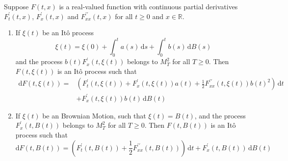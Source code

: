 \begin{theorem}[It\^o Formula]
	Suppose $F\left(t,x\right)$ is a real-valued function with continuous partial derivatives $F_{t}^{\prime}\left(t,x\right)$, $F_{x}^{\prime}\left(t,x\right)$ and $F_{xx}^{\prime\prime}\left(t,x\right)$ for all $t\geq 0$ and $x\in\mathbb{R}$.
	\begin{enumerate}
		\item If $\xi(t)$ be an It\^o process
		      \begin{equation*}
			      \xi(t)=\xi(0)+\int_{0}^{t}a(s)\,\mathrm{d}s+\int_{0}^{t}b(s)\,\mathrm{d}B(s)
		      \end{equation*}
		      and the process $b(t)F_{x}^{\prime}(t,\xi(t))$ belongs to $M_{T}^{2}$ for all $T\geq 0$. Then $F(t,\xi(t))$ is an It\^o process such that
		      \begin{equation}
			      \begin{aligned}
				      \mathrm{d}F(t,\xi(t))= & \left(F_{t}^{\prime}(t,\xi(t))+F_{x}^{\prime}(t,\xi(t))a(t)+\frac{1}{2}F_{xx}^{\prime\prime}(t,\xi(t))b(t)^{2}\right)\,\mathrm{d}t \\
				                             & +F_{x}^{\prime}(t,\xi(t))b(t)\,\mathrm{d}B(t)
			      \end{aligned}
		      \end{equation}
		\item If $\xi(t)$ be an Brownian Motion, such that $\xi(t)=B(t)$, and the process $F_{x}^{\prime}(t,B(t))$ belongs to $M_{T}^{2}$ for all $T \geq 0$. Then $F(t,B(t))$ is an It\^o process such that
		      \begin{equation}
			      \mathrm{d}F(t,B(t))=\left(F_{t}^{\prime}(t,B(t))+\frac{1}{2}F_{xx}^{\prime\prime}(t,B(t))\right)\,\mathrm{d}t+F_{x}^{\prime}(t,B(t))\,\mathrm{d}B(t)
		      \end{equation}
	\end{enumerate}
\end{theorem}

